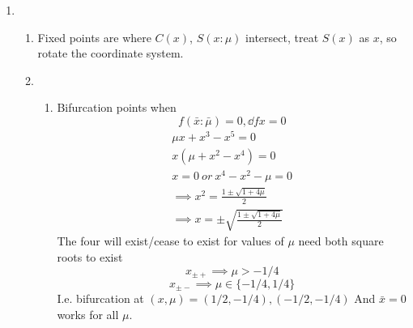 \documentclass{X:/Documents/Coding/Latex/myassignment}
\begin{document}
\begin{enumerate}
\begin{enumerate}
\end{enumerate}

    
    \item 
    \begin{enumerate}
        \item Fixed points are where $C(x)$, $S(x:\mu)$ intersect, treat $S(x)$ as $x$, so rotate the coordinate system.
        \item 
        \begin{enumerate}
            \item Bifurcation points when
            \[f(\bar x:\bar\mu) = 0, \dd fx = 0\]
            \begin{align*}
                \mu x + x^3 - x^5 = 0\\
                x(\mu + x^2 - x^4) = 0\\
                x= 0 \ or \ x^4 - x^2 -\mu=0 \\
                \implies x^2 = \frac{1\pm\sqrt{1+4\mu}}{2}\\
                \implies x = \pm \sqrt{\frac{1\pm\sqrt{1+4\mu}}{2}}
            \end{align*}
            The four will exist/cease to exist for values of $\mu$ need both square roots to exist
            \[x_{\pm+} \implies \mu > -1/4\]
            \[x_{\pm-} \implies \mu \in \{-1/4,1/4\}\]
            I.e. bifurcation at $(x,\mu) = (1/2,-1/4), (-1/2,-1/4)$
            And $\bar{x}=0$ works for all $\mu$.

\end{enumerate}
\end{enumerate}
\end{enumerate}
\end{document}
